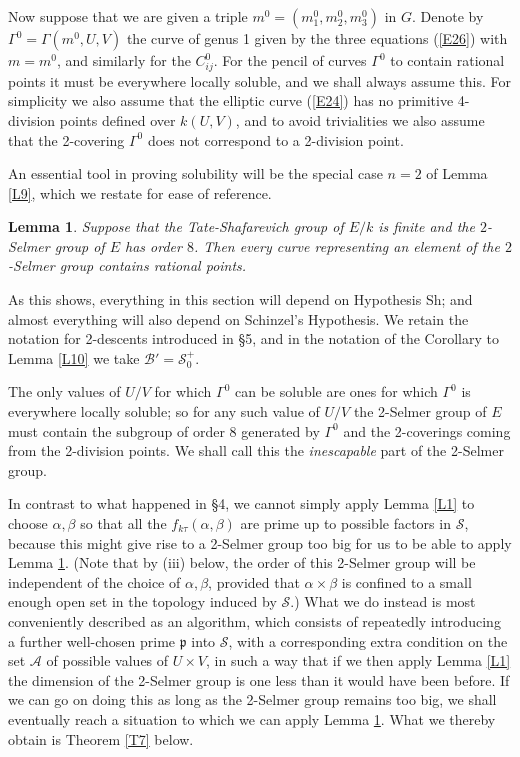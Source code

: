 \documentclass[12pt]{article}
\def\fp{{\mathfrak p}}
\def\ga{{\alpha}}
\def\gb{{\beta}}
\def\gG{{\Gamma}}
\def\sA{{\mathcal A}}
\def\sB{{\mathcal B}}
\def\sS{{\mathcal S}}
\def\Sha{\mbox{\wncyr Sh}}
\def\ble{\begin{lemma} \label}
\def\ele{\end{lemma}}
\newtheorem{lemma}{Lemma}
\begin{document}
Now suppose that we are given a triple $m^0=(m^0_1,m^0_2,
m^0_3)$ in $G$. Denote by $\gG^0=\gG(m^0,U,V)$ the curve of
genus 1 given by the three equations
(\ref{E26}) with $m=m^0$, and similarly for the $C_{ij}^0$.
For the pencil of curves $\gG^0$ to contain
rational points it must be
everywhere locally soluble, and we shall always
assume this. For simplicity we also assume that the elliptic
curve (\ref{E24}) has no primitive 4-division points defined
over $k(U,V)$, and to avoid trivialities we also assume that
the 2-covering $\gG^0$ does not
correspond to a 2-division point.

An essential tool in proving solubility will be the special case $n=2$ of
Lemma \ref{L9}, which we restate for ease of reference.
\ble{L11} Suppose that the Tate-Shafarevich group of $E/k$ is finite and the
$2$-Selmer group of $E$ has order $8$. Then every curve representing an element
of the $2$-Selmer group contains rational points.
\ele
As this shows, everything in this section will depend on Hypothesis \Sha; and
almost everything will also depend on Schinzel's Hypothesis. We retain the
notation for 2-descents introduced in \S5, and in the notation of the Corollary
to Lemma \ref{L10} we take $\sB'=\sS_0^+$.

The only values of $U/V$ for which $\gG^0$ can be soluble are
ones for which $\gG^0$ is everywhere locally soluble; so for
any such value of $U/V$ the 2-Selmer group of $E$ must
contain the subgroup of order 8 generated by $\gG^0$ and
the 2-coverings coming from the 2-division points. We shall
call this the
\emph{inescapable} part of the 2-Selmer group.

In contrast to what happened in \S4, we cannot simply apply
Lemma \ref{L1} to choose $\ga,\gb$ so that all the
$f_{k\tau}(\ga,\gb)$ are prime up to possible factors in
$\sS$, because this might give rise to a
2-Selmer group too big for us to be able to apply Lemma
\ref{L11}. (Note that by (iii) below, the order of this
2-Selmer group will be independent of the choice of $\ga,\gb$,
provided that $\ga\times\gb$ is confined to a small enough
open set in the topology induced by $\sS$.)
What we do instead is most conveniently
described as an algorithm, which
consists of repeatedly introducing a further well-chosen
prime $\fp$ into $\sS$, with a corresponding extra
condition on the set $\sA$ of possible values of $U\times V$,
in such a way that if we then apply Lemma \ref{L1} the
dimension of the 2-Selmer group is one less than it would
have been before. If we can go on doing this as long as the
2-Selmer group remains too big, we shall eventually reach a
situation to which we can apply Lemma \ref{L11}. What we
thereby obtain is Theorem \ref{T7} below.
\end{document}
